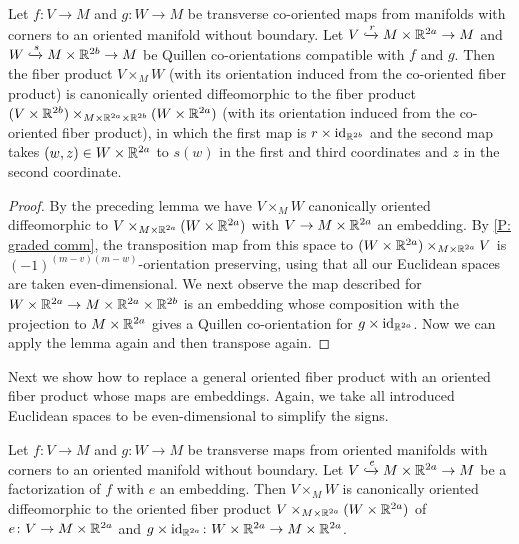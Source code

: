 \begin{corollary}\label{C: co-oriented full transition to embedded}
	Let $f \colon V \to M$ and $g \colon W \to M$ be transverse co-oriented maps from manifolds with corners to an oriented manifold without boundary.
	Let $V \xhookrightarrow{r} M \times \mathbb{R}^{2a} \to M$ and $W\xhookrightarrow{s} M \times \mathbb{R}^{2b} \to M$ be Quillen co-orientations compatible with $f$ and $g$.
	Then the fiber product $V \times_M W$ (with its orientation induced from the co-oriented fiber product) is canonically oriented diffeomorphic to the fiber product $(V \times \mathbb{R}^{2b}) \times_{M \times \mathbb{R}^{2a} \times \mathbb{R}^{2b}}(W \times \mathbb{R}^{2a})$ (with its orientation induced from the co-oriented fiber product), in which the first map is $r \times \mathrm{id}_{\mathbb{R}^{2b}}$ and the second map takes $(w,z) \in W \times \mathbb{R}^{2a}$ to $s(w)$ in the first and third coordinates and $z$ in the second coordinate.
\end{corollary}

\begin{proof}
	By the preceding lemma we have $V \times_M W$ canonically oriented diffeomorphic to $V\times_{M \times \mathbb{R}^{2a}}(W \times \mathbb{R}^{2a})$ with $V \to M \times \mathbb{R}^{2a}$ an embedding.
	By \cref{P: graded comm}, the transposition map from this space to $(W \times \mathbb{R}^{2a}) \times_{M \times \mathbb{R}^{2a}}V$ is $(-1)^{(m-v)(m-w)}$-orientation preserving, using that all our Euclidean spaces are taken even-dimensional.
	We next observe the map described for $W \times \mathbb{R}^{2a} \to M \times \mathbb{R}^{2a} \times \mathbb{R}^{2b}$ is an embedding whose composition with the projection to $M \times \mathbb{R}^{2a}$ gives a Quillen co-orientation for $g \times \mathrm{id}_{\mathbb{R}^{2a}}$.
	Now we can apply the lemma again and then transpose again.
\end{proof}

Next we show how to replace a general oriented fiber product with an oriented fiber product whose maps are embeddings.
Again, we take all introduced Euclidean spaces to be even-dimensional to simplify the signs.

\begin{lemma}
	Let $f \colon V \to M$ and $g \colon W \to M$ be transverse maps from oriented manifolds with corners to an oriented manifold without boundary.
	Let $V \xhookrightarrow{e}M \times \mathbb{R}^{2a} \to M$ be a factorization of $f$ with $e$ an embedding.
	Then $V \times_M W$ is canonically oriented diffeomorphic to the oriented fiber product $V\times_{M \times \mathbb{R}^{2a}} (W \times \mathbb{R}^{2a})$ of $e \colon V \to M \times \mathbb{R}^{2a}$ and $g \times \mathrm{id}_{\mathbb{R}^{2a}} \colon W \times \mathbb{R}^{2a} \to M \times \mathbb{R}^{2a}$.
\end{lemma}


